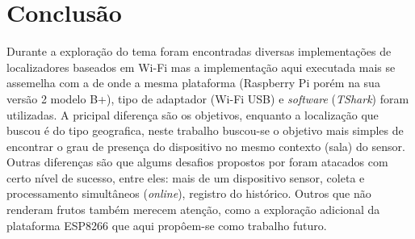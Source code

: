 \chapter{Conclusão}
\label{chap:Conclusao}

Durante a exploração do tema foram encontradas diversas implementações de
localizadores baseados em Wi-Fi mas a implementação aqui executada mais se
assemelha com a de \cite{Ferreira2016} onde a mesma plataforma
(Raspberry Pi porém na sua versão 2 modelo B+), tipo de adaptador (Wi-Fi USB)
e \emph{software} (\emph{TShark}) foram utilizadas. A pricipal diferença são os
objetivos, enquanto a localização que  buscou é do tipo
geografica, neste trabalho buscou-se o objetivo mais simples de encontrar o grau
de presença do dispositivo no mesmo contexto (sala) do sensor. Outras diferenças
são que algums desafios propostos por  foram atacados
com certo nível de sucesso, entre eles: mais de um dispositivo sensor,
coleta e processamento simultâneos (\emph{online}), registro do histórico.
Outros que não renderam frutos também merecem atenção, como a exploração
adicional da plataforma ESP8266 que aqui propôem-se como trabalho futuro.
